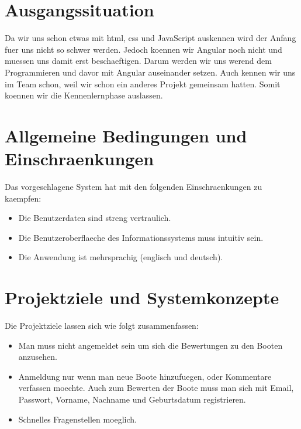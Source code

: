 \documentclass[12pt]{article}
\theoremstyle{definition}
\newenvironment{explanation}{%
   \setlength{\parindent}{0pt}
   \itshape
   \color{blue}
}{}
\begin{document}
\section{Ausgangssituation}
\begin{explanation}
Da wir uns schon etwas mit html, css und JavaScript auskennen wird der Anfang fuer uns nicht so schwer werden.
Jedoch koennen wir Angular noch nicht und muessen uns damit erst beschaeftigen. Darum werden wir uns werend dem Programmieren und davor mit Angular auseinander setzen. Auch kennen wir uns im Team schon, weil wir schon ein anderes Projekt gemeinsam hatten. Somit koennen wir die Kennenlernphase auslassen.
\end{explanation}

\pagebreak

\section{Allgemeine Bedingungen und Einschraenkungen}

\begin{explanation}
Das vorgeschlagene System hat mit den folgenden Einschraenkungen zu kaempfen:
\begin{itemize}
\item Die Benutzerdaten sind streng vertraulich.
\item Die Benutzeroberflaeche des Informationssystems muss intuitiv sein.
\item Die Anwendung ist mehrsprachig (englisch und deutsch).
\end{itemize}
\end{explanation}

\pagebreak

\section{Projektziele und Systemkonzepte}
\begin{explanation}
Die Projektziele lassen sich wie folgt zusammenfassen:
\begin{itemize}
\item Man muss nicht angemeldet sein um sich die Bewertungen zu den Booten anzusehen.
\item Anmeldung nur wenn man neue Boote hinzufuegen, oder Kommentare verfassen moechte.
Auch zum Bewerten der Boote muss man sich mit Email, Passwort, Vorname, Nachname und Geburtsdatum registrieren.
\item Schnelles Fragenstellen moeglich.
\end{itemize}
\end{explanation}
\end{document}
